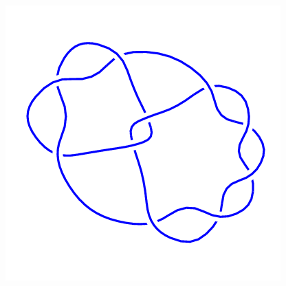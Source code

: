 \begin{figure}[H]
\begin{minipage}[b]{.18\linewidth}
    \end{minipage}
    \begin{minipage}[b]{.18\linewidth}
        \centering
        \includegraphics[width=\linewidth]{../data/10_46.png}
    \end{minipage}
\end{figure}
